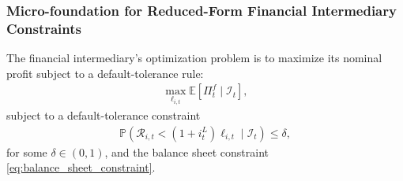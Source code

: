 \documentclass[12pt]{article}
\numberwithin{equation}{section}
\begin{document}
\begin{appendix}
\subsubsection{Micro-foundation for Reduced-Form Financial Intermediary Constraints}\label{app:benchmark_fi_micro_foundation}
The financial intermediary's optimization problem is to maximize its nominal profit subject to a default-tolerance rule:
\begin{align*}
    \max_{\ell_{i,t}} \mathbb{E} \left[ \Pi^f_t \mid \mathcal{I}_t \right],
\end{align*}
subject to a default-tolerance constraint
\begin{align}\label{eq:default_tolerance_rule}
    \mathbb{P} \left( \mathcal{R}_{i,t} < (1+i^L_{t})\ell_{i,t} \mid \mathcal{I}_t \right) \leq \delta,
\end{align}
for some $\delta \in (0,1)$, and the balance sheet constraint \eqref{eq:balance_sheet_constraint}.



\end{appendix}
\end{document}
